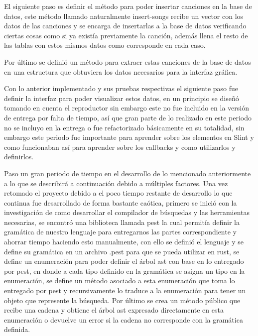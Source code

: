 \documentclass[12pt,a4paper]{article}
\begin{document}
El siguiente paso es definir el método para poder insertar canciones en la base de datos, este método llamado 
naturalmente insert-songs recibe un vector con los datos de las canciones y se encarga de insertarlas a la base de datos
verificando ciertas cosas como si ya existía previamente la canción, además llena el resto de las tablas con estos mismos datos
como corresponde en cada caso.

Por último se definió un método para extraer estas canciones de la base de datos en una estructura que obtuviera los datos
necesarios para la interfaz gráfica.

Con lo anterior implementado y sus pruebas respectivas el siguiente paso fue definir la interfaz para poder visualizar
estos datos, en un principio se diseñó tomando en cuenta el reproductor sin embargo este no fue incluido en la versión de entrega 
por falta de tiempo, así que gran parte de lo realizado en este periodo no se incluyo en la entrega o fue refactorizado básicamente
en su totalidad, sin embargo este periodo fue importante para aprender sobre los elementos en Slint y como funcionaban así 
para aprender sobre los callbacks y como utilizarlos y definirlos.

Paso un gran periodo de tiempo en el desarrollo de lo mencionado anteriormente a lo que se describirá a continuación
debido a múltiples factores. Una vez retomado el proyecto debido a el poco tiempo restante de desarrollo lo que continua 
fue desarrollado de forma bastante caótica, primero se inició con la investigación de como desarrollar el compilador de búsquedas y 
las herramientas necesarias, se encontró una biblioteca llamada pest la cual permitía definir la gramática de nuestro lenguaje 
para entregarnos las partes correspondiente y ahorrar tiempo haciendo esto manualmente, con ello se definió el lenguaje y se 
define su gramática en un archivo .pest para que se pueda utilizar en rust, se define un enumeración para poder definir el árbol 
ast con base en lo entregado por pest, en donde a cada tipo definido en la gramática se asigna un tipo en la enumeración, se define un método 
asociado a esta enumeración que toma lo entregado por pest y recursivamente lo traduce a la enumeración para tener un objeto que represente la búsqueda.
Por último se crea un método público que recibe una cadena y obtiene el árbol ast expresado directamente en esta enumeración o devuelve 
un error si la cadena no corresponde con la gramática definida.
\end{document}
